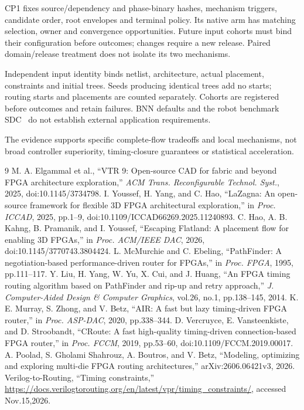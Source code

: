 \documentclass[conference,10pt]{IEEEtran}
\begin{document}
CP1 fixes source/dependency and phase-binary hashes, mechanism triggers, candidate order, root envelopes and terminal policy. Its native arm has matching selection, owner and convergence opportunities. Future input cohorts must bind their configuration before outcomes; changes require a new release. Paired domain/release treatment does not isolate its two mechanisms.

Independent input identity binds netlist, architecture, actual placement, constraints and initial trees. Seeds producing identical trees add no starts; routing starts and placements are counted separately. Cohorts are registered before outcomes and retain failures. BNN defaults and the robot benchmark SDC~\cite{vprsdc} do not establish external application requirements.

The evidence supports specific complete-flow tradeoffs and local mechanisms, not broad controller superiority, timing-closure guarantees or statistical acceleration.
\begin{thebibliography}{9}
 M. A. Elgammal et al., ``VTR 9: Open-source CAD for fabric and beyond FPGA architecture exploration,'' \emph{ACM Trans. Reconfigurable Technol. Syst.}, 2025, doi:10.1145/3734798.
 I. Youssef, H. Yang, and C. Hao, ``LaZagna: An open-source framework for flexible 3D FPGA architectural exploration,'' in \emph{Proc. ICCAD}, 2025, pp.1--9, doi:10.1109/ICCAD66269.2025.11240893.
 C. Hao, A. B. Kahng, B. Pramanik, and I. Youssef, ``Escaping Flatland: A placement flow for enabling 3D FPGAs,'' in \emph{Proc. ACM/IEEE DAC}, 2026, doi:10.1145/3770743.3804424.
 L. McMurchie and C. Ebeling, ``PathFinder: A negotiation-based performance-driven router for FPGAs,'' in \emph{Proc. FPGA}, 1995, pp.111--117.
 Y. Liu, H. Yang, W. Yu, X. Cui, and J. Huang, ``An FPGA timing routing algorithm based on PathFinder and rip-up and retry approach,'' \emph{J. Computer-Aided Design \& Computer Graphics}, vol.26, no.1, pp.138--145, 2014.
 K. E. Murray, S. Zhong, and V. Betz, ``AIR: A fast but lazy timing-driven FPGA router,'' in \emph{Proc. ASP-DAC}, 2020, pp.338--344.
 D. Vercruyce, E. Vansteenkiste, and D. Stroobandt, ``CRoute: A fast high-quality timing-driven connection-based FPGA router,'' in \emph{Proc. FCCM}, 2019, pp.53--60, doi:10.1109/FCCM.2019.00017.
 A. Poolad, S. Gholami Shahrouz, A. Boutros, and V. Betz, ``Modeling, optimizing and exploring multi-die FPGA routing architectures,'' arXiv:2606.06421v3, 2026.
 Verilog-to-Routing, ``Timing constraints,'' \url{https://docs.verilogtorouting.org/en/latest/vpr/timing_constraints/}, accessed Nov.15,2026.
\end{thebibliography}
\end{document}
